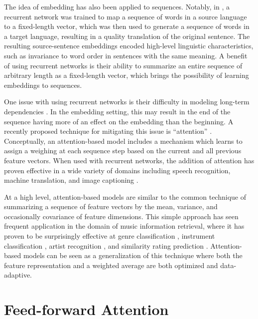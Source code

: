 \documentclass{article}
\begin{document}
The idea of embedding has also been applied to sequences.
Notably, in \cite{sutskever2014sequence}, a recurrent network was trained to map a sequence of words in a source language to a fixed-length vector, which was then used to generate a sequence of words in a target language, resulting in a quality translation of the original sentence.
The resulting source-sentence embeddings encoded high-level linguistic characteristics, such as invariance to word order in sentences with the same meaning.
A benefit of using recurrent networks is their ability to summarize an entire sequence of arbitrary length as a fixed-length vector, which brings the possibility of learning embeddings to sequences.

One issue with using recurrent networks is their difficulty in modeling long-term dependencies \cite{bengio1994learning}.
In the embedding setting, this may result in the end of the sequence having more of an effect on the embedding than the beginning.
A recently proposed technique for mitigating this issue is ``attention'' \cite{bahdanau2014neural}.
Conceptually, an attention-based model includes a mechanism which learns to assign a weighing at each sequence step based on the current and all previous feature vectors.
When used with recurrent networks, the addition of attention has proven effective in a wide variety of domains including speech recognition, machine translation, and image captioning \cite{cho2015describing}.

At a high level, attention-based models are similar to the common technique of summarizing a sequence of feature vectors by the mean, variance, and occasionally covariance of feature dimensions.
This simple approach has seen frequent application in the domain of music information retrieval, where it has proven to be surprisingly effective at genre classification \cite{bergstra2006aggregate, tzanetakis2002musical}, instrument classification \cite{deng2008study}, artist recognition \cite{mandel2005song}, and similarity rating prediction \cite{foster2014sequential}.
Attention-based models can be seen as a generalization of this technique where both the feature representation and a weighted average are both optimized and data-adaptive.

\section{Feed-forward Attention}
\label{sec:model}
\end{document}
